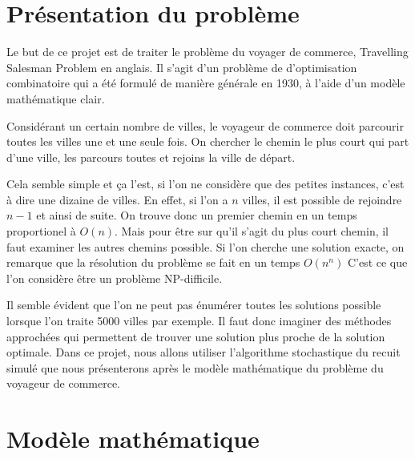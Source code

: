 \documentclass{article}
\begin{document}



\section{Présentation du problème}

Le but de ce projet est de traiter le problème du voyager de commerce, Travelling Salesman Problem en anglais.
Il s'agit d'un problème de d'optimisation combinatoire qui a été formulé de manière générale en 1930, à l'aide d'un modèle mathématique clair.

Considérant un certain nombre de villes, le voyageur de commerce doit parcourir toutes les villes une et une seule fois.
On chercher le chemin le plus court qui part d'une ville, les parcours toutes et rejoins la ville de départ.

Cela semble simple et ça l'est, si l'on ne considère que des petites instances, c'est à dire une dizaine de villes.
En effet, si l'on a $n$ villes, il est possible de rejoindre $n-1$ et ainsi de suite.
On trouve donc un premier chemin en un temps proportionel à $O(n)$.
Mais pour être sur qu'il s'agit du plus court chemin, il faut examiner les autres chemins possible.
Si l'on cherche une solution exacte, on remarque que la résolution du problème se fait en un temps $O(n^{n})$
C'est ce que l'on considère être un problème NP-difficile.

Il semble évident que l'on ne peut pas énumérer toutes les solutions possible lorsque l'on traite 5000 villes par exemple.
Il faut donc imaginer des méthodes approchées qui permettent de trouver une solution plus proche de la solution optimale.
Dans ce projet, nous allons utiliser l'algorithme stochastique du recuit simulé que nous présenterons après le modèle mathématique du problème du voyageur de commerce.

\section{Modèle mathématique}
\end{document}
